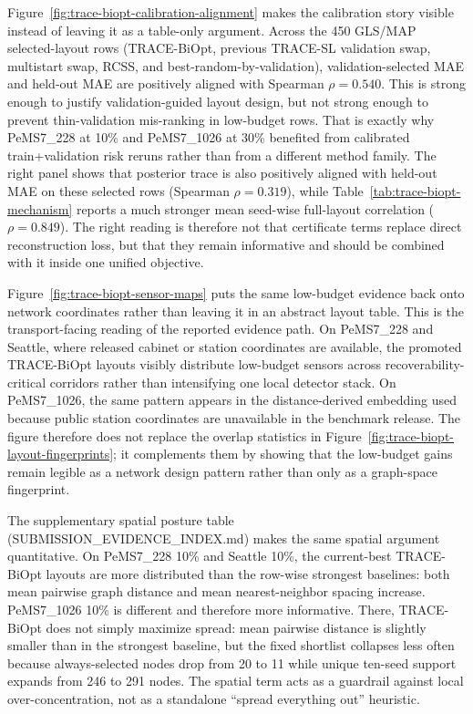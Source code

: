 Figure~\ref{fig:trace-biopt-calibration-alignment} makes the calibration story
visible instead of leaving it as a table-only argument. Across the 450 GLS/MAP
selected-layout rows (TRACE-BiOpt, previous TRACE-SL validation swap,
multistart swap, RCSS, and best-random-by-validation), validation-selected MAE
and held-out MAE are positively aligned with Spearman $\rho=0.540$. This is
strong enough to justify validation-guided layout design, but not strong enough
to prevent thin-validation mis-ranking in low-budget rows. That is exactly why
PeMS7\_228 at 10\% and PeMS7\_1026 at 30\% benefited from calibrated
train+validation risk reruns rather than from a different method family. The
right panel shows that posterior trace is also positively aligned with held-out
MAE on these selected rows (Spearman $\rho=0.319$), while
Table~\ref{tab:trace-biopt-mechanism} reports a much stronger mean seed-wise
full-layout correlation ($\rho=0.849$). The right reading is therefore not
that certificate terms replace direct reconstruction loss, but that they remain
informative and should be combined with it inside one unified objective.

Figure~\ref{fig:trace-biopt-sensor-maps} puts the same low-budget evidence back
onto network coordinates rather than leaving it in an abstract layout table.
This is the transport-facing reading of the reported evidence path. On PeMS7\_228
and Seattle, where released cabinet or station coordinates are available, the
promoted TRACE-BiOpt layouts visibly distribute low-budget sensors across
recoverability-critical corridors rather than intensifying one local detector
stack. On PeMS7\_1026, the same pattern appears in the distance-derived
embedding used because public station coordinates are unavailable in the
benchmark release. The figure therefore does not replace the
overlap statistics in Figure~\ref{fig:trace-biopt-layout-fingerprints}; it complements
them by showing that the low-budget gains remain legible as a network design
pattern rather than only as a graph-space fingerprint.

The supplementary spatial posture table (SUBMISSION\_EVIDENCE\_INDEX.md)
makes the same spatial argument quantitative. On PeMS7\_228 10\% and Seattle
10\%, the current-best TRACE-BiOpt layouts are more distributed than the
row-wise strongest baselines: both mean pairwise graph distance and mean
nearest-neighbor spacing increase. PeMS7\_1026 10\% is different and therefore
more informative. There, TRACE-BiOpt does not simply maximize spread: mean
pairwise distance is slightly smaller than in the strongest baseline, but the
fixed shortlist collapses less often because always-selected nodes drop from 20
to 11 while unique ten-seed support expands from 246 to 291 nodes. The spatial
term acts as a guardrail against local over-concentration, not as a standalone
``spread everything out'' heuristic.

